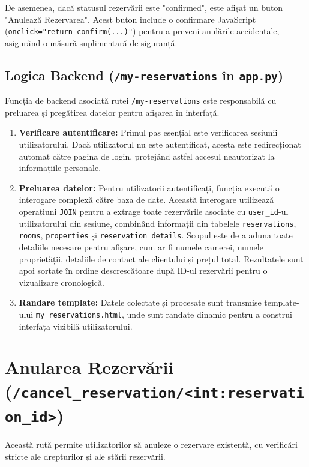 \documentclass[12pt, a4paper, oneside, romanian]{teza-upb}
\begin{document}
De asemenea, dacă statusul rezervării este "confirmed", este afișat un buton "Anulează Rezervarea". Acest buton include o confirmare JavaScript (\texttt{onclick="return confirm(...)"}) pentru a preveni anulările accidentale, asigurând o măsură suplimentară de siguranță.

\subsection{Logica Backend (\texttt{/my-reservations} în \texttt{app.py})}
Funcția de backend asociată rutei \texttt{/my-reservations} este responsabilă cu preluarea și pregătirea datelor pentru afișarea în interfață.
\begin{enumerate}
	\item \textbf{Verificare autentificare:} Primul pas esențial este verificarea sesiunii utilizatorului. Dacă utilizatorul nu este autentificat, acesta este redirecționat automat către pagina de login, protejând astfel accesul neautorizat la informațiile personale.
	\item \textbf{Preluarea datelor:} Pentru utilizatorii autentificați, funcția execută o interogare complexă către baza de date. Această interogare utilizează operațiuni \texttt{JOIN} pentru a extrage toate rezervările asociate cu \texttt{user\_id}-ul utilizatorului din sesiune, combinând informații din tabelele \texttt{reservations}, \texttt{rooms}, \texttt{properties} și \texttt{reservation\_details}. Scopul este de a aduna toate detaliile necesare pentru afișare, cum ar fi numele camerei, numele proprietății, detaliile de contact ale clientului și prețul total. Rezultatele sunt apoi sortate în ordine descrescătoare după ID-ul rezervării pentru o vizualizare cronologică.
	\item \textbf{Randare template:} Datele colectate și procesate sunt transmise template-ului \texttt{my\_reservations.html}, unde sunt randate dinamic pentru a construi interfața vizibilă utilizatorului.
\end{enumerate}





\section{Anularea Rezervării (\texttt{/cancel\_reservation/<int:reservation\_id>})}


Această rută permite utilizatorilor să anuleze o rezervare existentă, cu verificări stricte ale drepturilor și ale stării rezervării.
\end{document}

